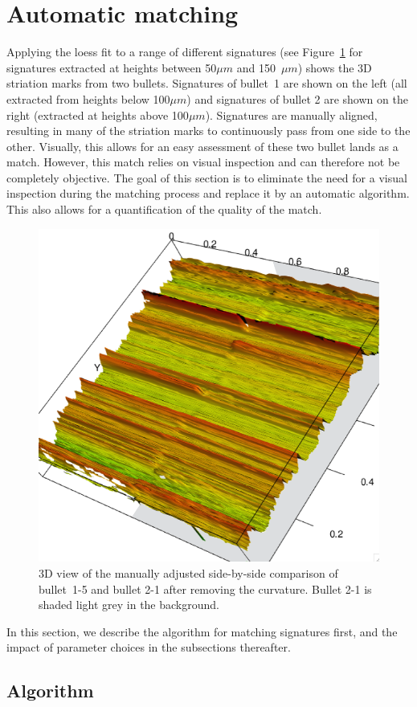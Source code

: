 \documentclass[aoas, preprint]{imsart}\usepackage[]{graphicx}\usepackage[]{color}
\begin{document}
\section{Automatic matching}
Applying the loess fit to a range of different signatures (see Figure~\ref{fig:manualmatch-rgl} for signatures extracted at heights between 50$\mu m$ and 150~$\mu m$) shows the 3D striation marks from two bullets. Signatures of bullet~1 are shown on the left (all extracted from heights below 100$\mu m$) and signatures of bullet 2 are shown on the right (extracted at heights above 100$\mu m$). Signatures are manually aligned, resulting in many of the striation marks to continuously pass from one side to the other. Visually, this allows for an easy assessment of these two bullet lands as a match. However, this match relies on visual inspection and can therefore not be completely objective.  The goal of this section is to eliminate the need for a visual inspection during the matching process and replace it by an automatic algorithm. This also allows for a quantification of the quality of the match.

\begin{figure}[hbtp]
\centering
\includegraphics[width=.65\columnwidth]{matchup-rgl-copy.png}
\caption{\label{fig:manualmatch-rgl}3D view of the manually adjusted side-by-side comparison of bullet~1-5 and bullet 2-1 after removing the curvature. Bullet 2-1 is shaded light grey in the background.}
\end{figure}

In this section, we describe the algorithm for matching signatures first, and the impact of parameter choices in the subsections thereafter.

\subsection{Algorithm}\label{sec:algorithm}
\end{document}
